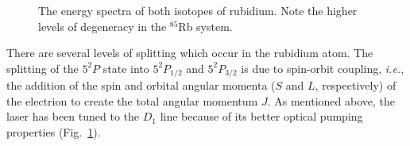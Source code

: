 \begin{figure}[h]
\begin{center}
\hspace{-1mm}
\vspace{-2mm}
\vspace{-2mm}
\caption{\small{The energy spectra of both isotopes of rubidium. Note the higher levels of degeneracy in the $^{85}$Rb system.}}
\label{fig:8587levels}
\end{center}
\end{figure}

There are several levels of splitting which occur in the rubidium atom. The
splitting of the $5^2P$ state into $5^2P_{1/2}$ and $5^2P_{3/2}$ is
due to spin-orbit coupling, \emph{i.e.}, the addition of the spin and
orbital angular momenta ($S$ and $L$, respectively) of the electrion
to create the total angular momentum $J$. As mentioned above, the
laser has been tuned to the $D_1$ line because of its better optical
pumping properties (Fig.~\ref{fig:8587levels}).


